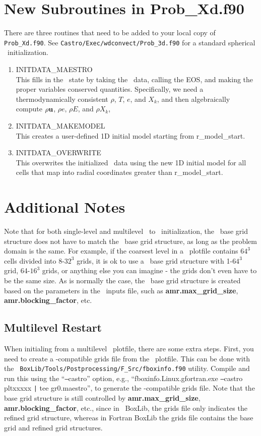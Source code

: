 \section{New Subroutines in Prob\_Xd.f90}
There are three routines that need to be added to your local copy of
{\tt Prob\_Xd.f90}.  See {\tt Castro/Exec/wdconvect/Prob\_3d.f90} for
a standard spherical \maestro\ initialization.
\begin{enumerate}
\item INITDATA\_MAESTRO\\ This fills in the \castro\ state by taking
  the \maestro\ data, calling the EOS, and making the proper variables
  conserved quantities.  Specifically, we need a thermodynamically
  consistent $\rho$, $T$, $e$, and $X_k$, and then algebraically
  compute $\rho{\bf u}$, $\rho e$, $\rho E$, and $\rho X_k$,
\item INITDATA\_MAKEMODEL\\
This creates a user-defined 1D initial model starting from r\_model\_start.
\item INITDATA\_OVERWRITE\\ This overwrites the initialized \castro\
  data using the new 1D initial model for all cells that map into
  radial coordinates greater than r\_model\_start.
\end{enumerate}

\section{Additional Notes}
Note that for both single-level and multilevel \maestro\ to \castro\
initialization, the \castro\ base grid structure does not have to match
the \maestro\ base grid structure, as long as the problem domain is the
same.  For example, if the coarsest level in a \maestro\ plotfile
contains $64^3$ cells divided into 8-$32^3$ grids, it is ok to use a
\castro\ base grid structure with 1-$64^3$ grid, 64-$16^3$ grids, or
anything else you can imagine - the grids don't even have to be the
same size.  As is normally the case, the \castro\ base grid structure is
created based on the parameters in the \castro\ inputs file, such as
{\bf amr.max\_grid\_size}, {\bf amr.blocking\_factor}, etc.

\subsection{Multilevel Restart}
When initialing from a multilevel \maestro\ plotfile, there are some
extra steps.  First, you need to create a \castro-compatible grids file
from the \maestro\ plotfile.  This can be done with the {\tt
  BoxLib/Tools/Postprocessing/F\_Src/fboxinfo.f90} utility.  Compile
and run this using the ``\texttt{--}castro'' option, e.g.,
``fboxinfo.Linux.gfortran.exe \texttt{--}castro pltxxxxx \texttt{|}
tee gr0.maestro'', to generate the \castro-compatible grids file.  Note
that the base grid structure is still controlled by {\bf
  amr.max\_grid\_size}, {\bf amr.blocking\_factor}, etc., since in \cpp\
BoxLib, the grids file only indicates the refined grid structure,
whereas in Fortran BoxLib the grids file contains the base grid and
refined grid structures.

